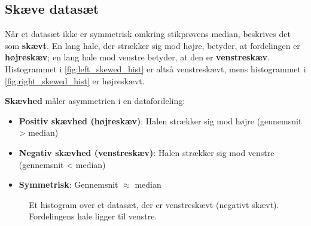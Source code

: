 \subsection*{Skæve datasæt}
Når et datasæt ikke er symmetrisk omkring stikprøvens median, beskrives det som \textbf{skævt}. En lang hale, der strækker sig mod højre, betyder, at fordelingen er \textbf{højreskæv}; en lang hale mod venstre betyder, at den er \textbf{venstreskæv}. Histogrammet i \autoref{fig:left_skewed_hist} er altså venstreskævt, mens histogrammet i \autoref{fig:right_skewed_hist} er højreskævt.

\begin{definition}[Skævhed]
    \textbf{Skævhed} måler asymmetrien i en datafordeling:
    \begin{itemize}
        \item \textbf{Positiv skævhed (højreskæv)}: Halen strækker sig mod højre (gennemsnit > median)
        \item \textbf{Negativ skævhed (venstreskæv)}: Halen strækker sig mod venstre (gennemsnit < median)
        \item \textbf{Symmetrisk}: Gennemsnit $\approx$ median
    \end{itemize}
    \end{definition}

\begin{figure}[htbp]
    \centering
    \caption{Et histogram over et datasæt, der er venstreskævt (negativt skævt). Fordelingens hale ligger til venstre.}
    \label{fig:left_skewed_hist}
\end{figure}

